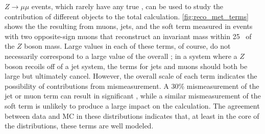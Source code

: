 $Z\rightarrow\mu\mu$ events, which rarely have any true \met, can be used to study the contribution of different objects to the total \met calculation. \autoref{fig:reco_met_terms} shows the the \met resulting from muons, jets, and the soft term measured in events with two opposite-sign muons that reconstruct an invariant mass within 25 \gev~of the $Z$ boson mass. Large values in each of these terms, of course, do not necessarily correspond to a large value of the overall \met; in a system where a $Z$ boson recoils off of a jet system, the terms for jets and muons should both be large but ultimately cancel. However, the overall scale of each term indicates the possibility of contributions from mismeasurement. A 30\% mismeasurement of the jet or muon term can result in significant \met, while a similar mismeasurement of the soft term is unlikely to produce a large impact on the \met calculation. The agreement between data and \ac{MC} in these distributions indicates that, at least in the core of the distributions, these \met terms are well modeled.  


